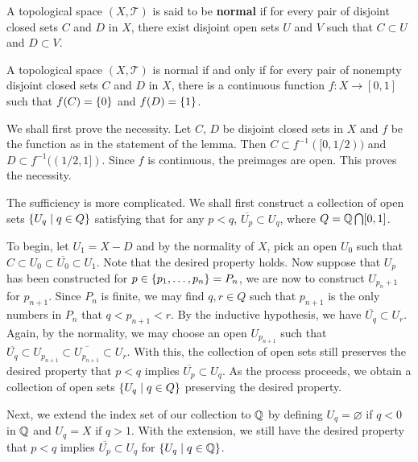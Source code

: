 \begin{definition*}
    A topological space $(X,\mathcal{T})$ is said to be 
    \textbf{normal} if for every pair of disjoint closed 
    sets $C$ and $D$ in $X$, there exist disjoint open sets 
    $U$ and $V$ such that $C\subset U$ and $D\subset V$.
\end{definition*}

\begin{lemma}
    A topological space $(X,\mathcal{T})$ is normal if 
    and only if for every pair of nonempty disjoint closed 
    sets $C$ and $D$ in $X$, there is a continuous function 
    $f:X\to[0,1]$ such that $f(C)=\left\{ {0} \right\}$ and 
    $f(D)=\left\{ {1} \right\}$.
\end{lemma}
\begin{pf}
    We shall first prove the necessity. Let $C$, $D$ be 
    disjoint closed sets in $X$ and $f$ be the function as 
    in the statement of the lemma. Then $C\subset 
    f^{-1}([0,1/2))$ and $D\subset f^{-1}((1/2,1])$. Since 
    $f$ is continuous, the preimages are open. This proves
    the necessity.

    The sufficiency is more complicated. We shall first 
    construct a collection of open sets $\left\{ U_q \;\middle\vert\; q\in Q \right\}$ 
    satisfying that for any $p<q$, $\overline{U_p}\subset
    U_q$, where $Q = \mathbb{Q}\bigcap[0,1]$. 

    To begin, let $U_1 = X-D$ and by the normality of $X$, 
    pick an open $U_0$ such that $C\subset U_0\subset 
    \overline{U_0}\subset U_1$. Note that the desired property 
    holds. Now suppose that $U_p$ has been constructed for 
    $p\in\left\{ {p_1,\ldots,p_n} \right\} = P_n$, we are now to construct 
    $U_{p_n+1}$ for $p_{n+1}$. Since $P_n$ is finite, we may 
    find $q,r\in Q$ such that $p_{n+1}$ is the only numbers in 
    $P_n$ that $q<p_{n+1}<r$. By the inductive hypothesis, we 
    have $\overline{U_q}\subset U_r$. Again, by the normality, 
    we may choose an open $U_{p_{n+1}}$ such that 
    $\overline{U_q}\subset U_{p_{n+1}}\subset 
    \overline{U_{p_{n+1}}}\subset U_r$. With this, the 
    collection of open sets still preserves the desired 
    property that $p<q$ implies $\overline{U_p}\subset U_q$. 
    As the process proceeds, we obtain a collection of open 
    sets $\left\{ U_q \;\middle\vert\; q\in Q \right\}$ preserving the desired property. 

    Next, we extend the index set of our collection to $\mathbb{Q}$ 
    by defining $U_q = \varnothing$ if $q<0$ in $\mathbb{Q}$ and 
    $U_q = X$ if $q>1$. With the extension, we still have the 
    desired property that $p<q$ implies $\overline{U_p}\subset
    U_q$ for $\left\{ U_q \;\middle\vert\; q\in\mathbb{Q} \right\}$.


\end{pf}
